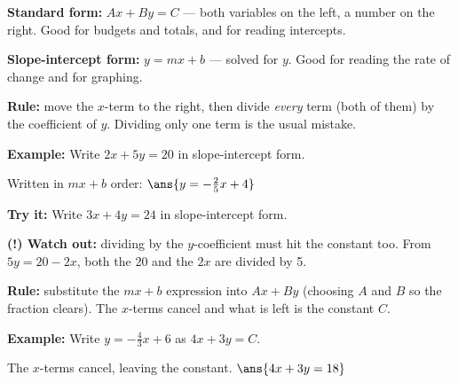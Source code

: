 \documentclass[12pt]{article}
\begin{document}

\begin{formulabox}
\textbf{Standard form:} $Ax + By = C$ \quad --- both variables on the left, a
number on the right. Good for budgets and totals, and for reading intercepts.\par
\textbf{Slope-intercept form:} $y = mx + b$ \quad --- solved for $y$. Good for
reading the rate of change and for graphing.
\end{formulabox}


\begin{formulabox}
\textbf{Rule:} move the $x$-term to the right, then divide \emph{every} term
(both of them) by the coefficient of $y$. Dividing only one term is the usual
mistake.
\end{formulabox}

\begin{examplebox}
\textbf{Example:} \quad Write $2x + 5y = 20$ in slope-intercept form.

Written in $mx + b$ order: \quad $\ans{y = -\tfrac{2}{5}x + 4}$
\end{examplebox}

\begin{tryitbox}
\textbf{Try it:} \quad Write $3x + 4y = 24$ in slope-intercept form.\\[2pt]
\end{tryitbox}

\begin{watchoutbox}
\textbf{(!) Watch out:} dividing by the $y$-coefficient must hit the constant
too. From $5y = 20 - 2x$, both the 20 and the $2x$ are divided by 5.
\end{watchoutbox}


\begin{formulabox}
\textbf{Rule:} substitute the $mx + b$ expression into $Ax + By$ (choosing
$A$ and $B$ so the fraction clears). The $x$-terms cancel and what is left is
the constant $C$.
\end{formulabox}

\begin{examplebox}
\textbf{Example:} \quad Write $y = -\frac{4}{3}x + 6$ as $4x + 3y = C$.

The $x$-terms cancel, leaving the constant. \quad $\ans{4x + 3y = 18}$
\end{examplebox}
\end{document}

